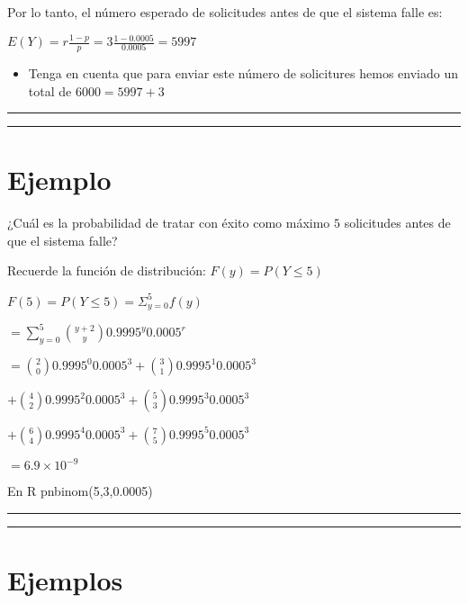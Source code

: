 \documentclass[
]{book}
\providecommand{\tightlist}{%
  \setlength{\itemsep}{0pt}\setlength{\parskip}{0pt}}
\begin{document}
Por lo tanto, el número esperado de solicitudes antes de que el sistema falle es:

\(E(Y)=r\frac{1-p}{p}=3\frac{1-0.0005}{0.0005}=5997\)

\begin{itemize}
\tightlist
\item
  Tenga en cuenta que para enviar este número de solicitures hemos enviado un total de \(6000=5997+3\)
\end{itemize}

\begin{center}\rule{0.5\linewidth}{0.5pt}\end{center}

\begin{center}\rule{0.5\linewidth}{0.5pt}\end{center}

\hypertarget{ejemplo-11}{%
\section{Ejemplo}\label{ejemplo-11}}

¿Cuál es la probabilidad de tratar con éxito como máximo \(5\) solicitudes antes de que el sistema falle?

Recuerde la función de distribución: \(F(y)=P(Y\leq 5)\)

\(F(5)=P(Y\leq 5)=\Sigma_{y=0}^5 f(y)\)

\(=\sum_{y=0}^5\binom {y+2} y 0.9995^y 0.0005^r\)

\(=\binom{2} 0 0.9995^0 0.0005^3 +\binom{3} 1 0.9995^1 0.0005^3\)

\(+\binom{4} 2 0.9995^2 0.0005^3 +\binom{5} 3 0.9995^3 0.0005^3\)

\(+\binom {6} 4 0.9995^4 0.0005^3 +\binom {7} 5 0.9995^5 0.0005^3\)

\(= 6.9\times 10^{-9}\)

En R pnbinom(5,3,0.0005)

\begin{center}\rule{0.5\linewidth}{0.5pt}\end{center}

\begin{center}\rule{0.5\linewidth}{0.5pt}\end{center}

\hypertarget{ejemplos}{%
\section{Ejemplos}\label{ejemplos}}
\end{document}
